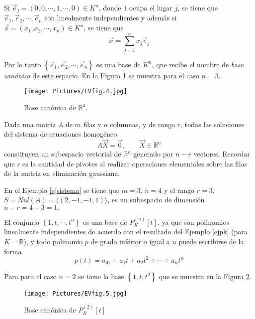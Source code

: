 \begin{example}


Si $\vec{e}_j=(0,0,\cdots,1,\cdots,0)\in K^{n}$, donde $1$ ocupa el lugar $j$, se tiene que $\vec{e}_1,\vec{e}_2,\cdots, \vec{e}_n$ son linealmente independientes y además si $\vec{x}=(x_1,x_2, \cdots,x_n)\in K^{n}$, se tiene que 
$$\vec{x}=\sum_{j=1}^{n}x_j\vec{e}_j$$

Por lo tanto $\left\{\vec{e}_1,\vec{e}_2,\cdots, \vec{e}_n\right\}$ es una base de $K^{n}$, que recibe el nombre de \textit{base canónica} de este espacio.  En la Figura \ref{EVfig. 4} se muestra  para el caso $n=3$.

\bigskip
\end{example}
\begin{figure}
    \centering
    \texttt{[image: Pictures/EVfig.4.jpg]}
    \caption{Base canónica  de $\mathbb{R}^3$. }
    \label{EVfig. 4}
\end{figure}



\begin{example}
Dada una matriz $A$ de $m$ filas y $n$ columnas, y de rango $r$, todas las soluciones del sistema de ecuaciones homogéneo
$$A \vec{X}=\vec{0}, \qquad   \vec{X} \in \mathbb{R}^n$$
constituyen un subespacio vectorial de $\mathbb{R}^n$ generado por  $n-r$ vectores. Recordar que $r$ es la cantidad de pivotes al realizar operaciones elementales sobre las filas de la matriz  en eliminación gaussiana.

\bigskip
En el Ejemplo \ref{ejsistema} se tiene que  $m=3$, $n=4$ y el rango $r=3$. $S=Nul(A) = \langle (2,-1,-1,1) \rangle $,  es un subespacio de dimensión 
$n-r=4-3=1.$
\end{example}
\bigskip

\begin{example}

El conjunto $\left\{1,t,\cdots, t^{n}\right\}$ es una base de $P_K^{(n)}\left[t\right]$, ya que son polinomios linealmente independientes de acuerdo con el resultado del Ejemplo \ref{ejpk} (para $K= \mathbb{R}$), y todo polinomio $p$ de grado inferior o igual a $n$ puede escribirse de la forma
$$p(t)=a_01+a_1t+a_2t^{2} + \cdots +a_nt^{n}$$

 Para   para el caso $n=2$ se tiene la base $\left\{1,t, t^{2}\right\}$ que se muestra  en la Figura \ref{EVfig5}.
\end{example}

\begin{figure}
    \centering
    \texttt{[image: Pictures/EVfig.5.jpg]}
    \caption{Base canónica de $P_R^{(2)}\left[t\right]$ }
    \label{EVfig5}
\end{figure}

